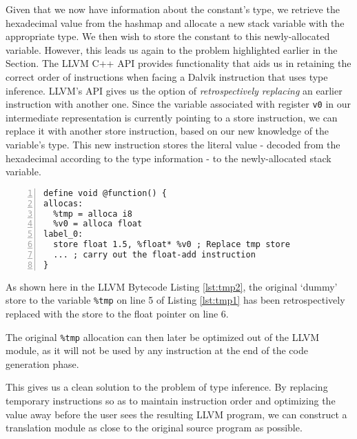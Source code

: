 Given that we now have information about the constant's type, we retrieve the hexadecimal value from the hashmap and allocate a new stack variable with the appropriate type. We then wish to store the constant to this newly-allocated variable. However, this leads us again to the problem highlighted earlier in the Section. The LLVM C++ API provides functionality that aids us in retaining the correct order of instructions when facing a Dalvik instruction that uses type inference. LLVM's API gives us the option of \textit{retrospectively replacing} an earlier instruction with another one. Since the variable associated with register \verb|v0| in our intermediate representation is currently pointing to a store instruction, we can replace it with another store instruction, based on our new knowledge of the variable's type. This new instruction stores the literal value - decoded from the hexadecimal according to the type information - to the newly-allocated stack variable.

\begin{lstlisting}[frame=single, numbers=left, numberstyle=\tiny, caption={LLVM bytecode}, label=lst:tmp2]
define void @function() {
allocas:
  %tmp = alloca i8
  %v0 = alloca float
label_0:
  store float 1.5, %float* %v0 ; Replace tmp store
  ... ; carry out the float-add instruction
}
\end{lstlisting}

As shown here in the LLVM Bytecode Listing \ref{lst:tmp2}, the original `dummy' store to the variable \verb|%tmp| on line 5 of Listing \ref{lst:tmp1} has been retrospectively replaced with the store to the float pointer on line 6.

The original \verb|%tmp| allocation can then later be optimized out of the LLVM module, as it will not be used by any instruction at the end of the code generation phase.

This gives us a clean solution to the problem of type inference. By replacing temporary instructions so as to maintain instruction order and optimizing the value away before the user sees the resulting LLVM program, we can construct a translation module as close to the original source program as possible.
